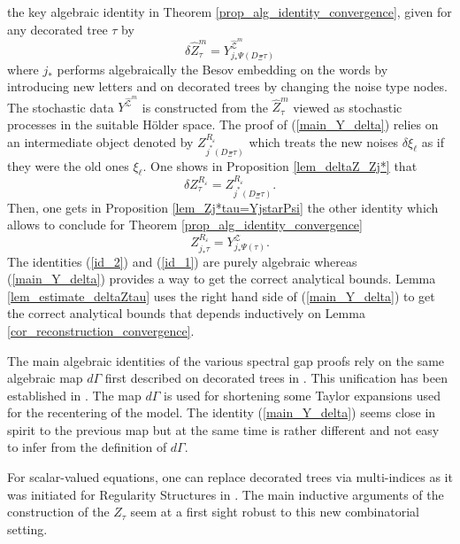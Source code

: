 \documentclass[11pt]{preprint}
\newcommand{\mcZ}{\mathcal{Z}}
\def\eqref#1{(\ref{#1})}
\begin{document}
		the key algebraic identity in Theorem \ref{prop_alg_identity_convergence}, given for any decorated tree $ \tau $ by
		\begin{equation} \label{main_Y_delta}
		\delta \widehat{Z}_\tau^m = Y^{\widehat{\mcZ}^m
			}_{j_*\Psi(D_\Xi\tau)}
		\end{equation}
where $j_*$ performs algebraically the Besov embedding on the words by introducing new letters and on decorated trees by changing the noise type nodes. The stochastic data $Y^{\widehat{\mathcal{Z}}^m}$ is constructed from the $ \widehat{Z}^m_{\tau} $ viewed as stochastic processes in the suitable Hölder space.  The proof of \eqref{main_Y_delta} relies on an intermediate object denoted by $ Z^{R_{\varepsilon}}_{j^* (D_{\Xi}\tau)} $ which treats the new noises $  \delta \xi_{\ell}$ as if they were the old ones $ \xi_{\ell} $.  One shows in Proposition \ref{lem_deltaZ_Zj*} that
\begin{equation} \label{id_2}
\delta Z_\tau^{R_{\varepsilon}} = 	Z^{R_{\varepsilon}}_{j^* (D_{\Xi}\tau)}.
\end{equation}
Then, one gets in Proposition \ref{lem_Zj*tau=YjstarPsi}  the other identity which allows to conclude for Theorem \ref{prop_alg_identity_convergence}
\begin{equation} \label{id_1}
	Z_{j_*\tau}^{R_{\varepsilon}} =  Y_{j_*\Psi(\tau)}^{\mcZ}.
\end{equation}
The identities \eqref{id_2} and \eqref{id_1} are purely algebraic whereas \eqref{main_Y_delta} provides a way to get the correct analytical bounds. Lemma \ref{lem_estimate_deltaZtau} uses the right hand side of \eqref{main_Y_delta} to get the correct analytical bounds that depends inductively on Lemma \ref{cor_reconstruction_convergence}.

\begin{remark}
	The main algebraic identities of the various spectral gap proofs \cite{LOTP,HS23,BH23} rely on the same algebraic map $ d \Gamma $ first described on decorated trees in \cite{BN23}. This unification has been established in \cite{BM26a}. The map $d \Gamma$ is used for shortening some Taylor expansions used for the recentering of the model.  The identity \eqref{main_Y_delta} seems close in spirit to the previous map but at the same time is rather different and not easy to infer from the definition of $d \Gamma$.
	\end{remark}

	
	\begin{remark} For scalar-valued equations, one can replace decorated trees via multi-indices as it was initiated for Regularity Structures in \cite{OSSW,LOT}. The main inductive arguments of the construction of the $Z_{\tau}$ seem at a first sight robust to this new combinatorial setting.
		\end{remark}
	
\end{document}
